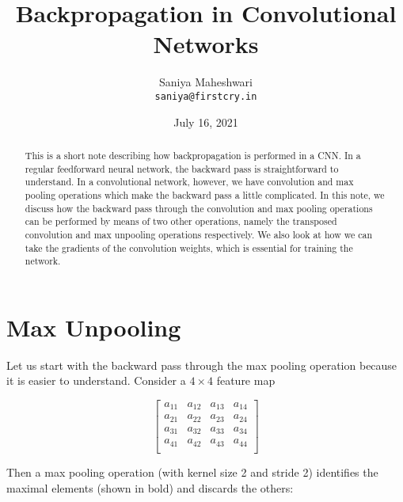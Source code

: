 \documentclass{article}[a4paper]
\begin{document}
\title{Backpropagation in Convolutional Networks}
\author{Saniya Maheshwari \\ \texttt{saniya@firstcry.in}}
\date{July 16, 2021}
\maketitle

\begin{abstract}
	This is a short note describing how backpropagation is performed in a CNN. In a regular feedforward neural network, the backward pass is straightforward to understand. In a convolutional network, however, we have convolution and max pooling operations which make the backward pass a little complicated. In this note, we discuss how the backward pass through the convolution and max pooling operations can be performed by means of two other operations, namely the transposed convolution and max unpooling operations respectively. We also look at how we can take the gradients of the convolution weights, which is essential for training the network.
\end{abstract}

\section{Max Unpooling}
Let us start with the backward pass through the max pooling operation because it is easier to understand. Consider a $4 \times 4$ feature map

\begin{equation*}
	\begin{bmatrix}
		a_{11} & a_{12} & a_{13} & a_{14} \\
		a_{21} & a_{22} & a_{23} & a_{24} \\
		a_{31} & a_{32} & a_{33} & a_{34} \\
		a_{41} & a_{42} & a_{43} & a_{44} \\
	\end{bmatrix}
\end{equation*}

Then a max pooling operation (with kernel size 2 and stride 2) identifies the maximal elements (shown in bold) and discards the others:
\end{document}
